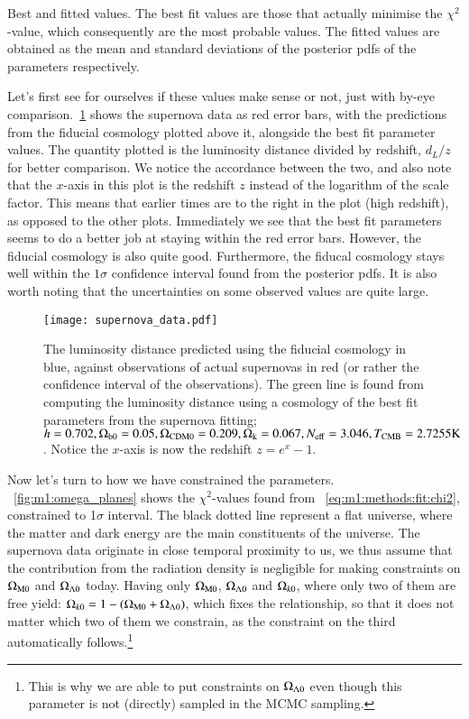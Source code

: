     \begin{table}
        
        \caption{Best and fitted values. The best fit values are those that actually minimise the $\chi^2$-value, which consequently are the most probable values. The fitted values are obtained as the mean and standard deviations of the posterior pdfs of the parameters respectively. }
        \label{tab:m1:best_fit_values}
    \end{table}
    Let's first see for ourselves if these values make sense or not, just with by-eye comparison.~\cref{fig:m1:supernova_data} shows the supernova data as red error bars, with the predictions from the fiducial cosmology plotted above it, alongside the best fit parameter values. The quantity plotted is the luminosity distance divided by redshift, $d_L/z$ for better comparison. We notice the accordance between the two, and also note that the $x$-axis in this plot is the redshift $z$ instead of the logarithm of the scale factor. This means that earlier times are to the right in the plot (high redshift), as opposed to the other plots. Immediately we see that the best fit parameters seems to do a better job at staying within the red error bars. However, the fiducial cosmology is also quite good. Furthermore, the fiducal cosmology stays well within the $1\sigma$ confidence interval found from the posterior pdfs. It is also worth noting that the uncertainties on some observed values are quite large. 

    \begin{figure}
        \texttt{[image: supernova\_data.pdf]}
        \caption{The luminosity distance predicted using the fiducial cosmology in blue, against observations of actual supernovas in red (or rather the confidence interval of the observations). The green line is found from computing the luminosity distance using a cosmology of the best fit parameters from the supernova fitting; $h=0.702, \Omega_\mathrm{b0} = 0.05, \Omega_\mathrm{CDM0} = 0.209, \Omega_\mathrm{k}=0.067, N_\mathrm{eff}=3.046, T_\mathrm{CMB}=2.7255 \text{K}$. Notice the $x$-axis is now the redshift $z=e^x-1$.}
        \label{fig:m1:supernova_data}
    \end{figure}

    Now let's turn to how we have constrained the parameters. ~\cref{fig:m1:omega_planes} shows the $\chi^2$-values found from ~\cref{eq:m1:methods:fit:chi2}, constrained to 1$\sigma$ interval. The black dotted line represent a flat universe, where the matter and dark energy are the main constituents of the universe. The supernova data originate in close temporal proximity to us, we thus assume that the contribution from the radiation density is negligible for making constraints on $\Omega_\mathrm{M0}$ and $\Omega_{\Lambda0}$ today. Having only $\Omega_\mathrm{M0}$, $\Omega_{\Lambda0}$ and $\Omega_{k0}$, where only two of them are free yield: $\Omega_{k0}=1-(\Omega_\mathrm{M0}+\Omega_{\Lambda0})$, which fixes the relationship, so that it does not matter which two of them we constrain, as the constraint on the third automatically follows.\footnote{This is why we are able to put constraints on $\Omega_{\Lambda0}$ even though this parameter is not (directly) sampled in the MCMC sampling.}
    
